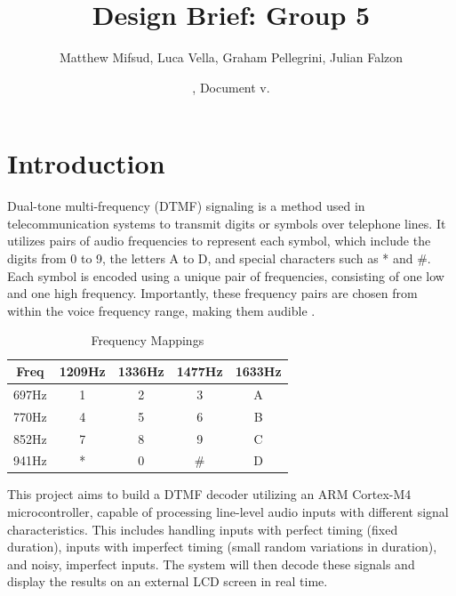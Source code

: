 \documentclass{cce2014-design}
\title{Design Brief: Group 5}
\author{
 Matthew Mifsud,
 Luca Vella,
 Graham Pellegrini,
 Julian Falzon
 }
\date{\svnMaxToday, Document v.\svnInfoMaxRevision}
\begin{document}
\maketitle


\section{Introduction}
Dual-tone multi-frequency (DTMF) signaling is a method used in telecommunication systems to transmit digits or symbols over telephone lines. It utilizes pairs of audio frequencies to represent each symbol, which include the digits from 0 to 9, the letters A to D, and special characters such as * and \#.
Each symbol is encoded using a unique pair of frequencies, consisting of one low and one high frequency.
Importantly, these frequency pairs are chosen from within the voice frequency range, making them audible \cite{DTMF_Wikipedia}.

\begin{table}[h!]
   \begin{center}
      \begin{tabular}{ |c|c|c|c|c| }
         \hline
         Freq  & 1209Hz & 1336Hz & 1477Hz & 1633Hz \\
         \hline
         697Hz & 1      & 2      & 3      & A      \\
         \hline
         770Hz & 4      & 5      & 6      & B      \\
         \hline
         852Hz & 7      & 8      & 9      & C      \\
         \hline
         941Hz & *      & 0      & \#     & D      \\
         \hline
      \end{tabular}
      \caption{Frequency Mappings}
      \label{table:frequencies}
   \end{center}
\end{table}

This project aims to build a DTMF decoder utilizing an ARM Cortex-M4 microcontroller, capable of processing line-level audio inputs with different signal characteristics.
This includes handling inputs with perfect timing (fixed duration), inputs with imperfect timing (small random variations in duration), and noisy, imperfect inputs.
The system will then decode these signals and display the results on an external LCD screen in real time.
\end{document}
